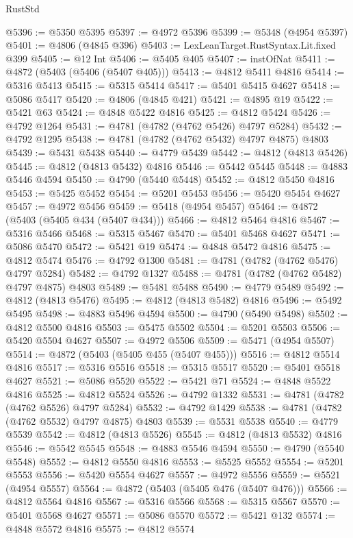 \begin{lexlean}{RustStd}
\begin{coremodule}
@5396 := @5350 @5395
@5397 := @4972 @5396
@5399 := @5348 (@4954 @5397)
@5401 := @4806 (@4845 @396)
@5403 := LexLeanTarget.RustSyntax.Lit.fixed @399
@5405 := @12 Int
@5406 := @5405 @405
@5407 := instOfNat
@5411 := @4872 (@5403 (@5406 (@5407 @405)))
@5413 := @4812 @5411 @4816
@5414 := @5316 @5413
@5415 := @5315 @5414
@5417 := @5401 @5415 @4627
@5418 := @5086 @5417
@5420 := @4806 (@4845 @421)
@5421 := @4895 @19
@5422 := @5421 @63
@5424 := @4848 @5422 @4816
@5425 := @4812 @5424
@5426 := @4792 @1264
@5431 := @4781 (@4782 (@4762 @5426) @4797 @5284)
@5432 := @4792 @1295
@5438 := @4781 (@4782 (@4762 @5432) @4797 @4875) @4803
@5439 := @5431 @5438
@5440 := @4779 @5439
@5442 := @4812 (@4813 @5426)
@5445 := @4812 (@4813 @5432) @4816
@5446 := @5442 @5445
@5448 := @4883 @5446 @4594
@5450 := @4790 (@5440 @5448)
@5452 := @4812 @5450 @4816
@5453 := @5425 @5452
@5454 := @5201 @5453
@5456 := @5420 @5454 @4627
@5457 := @4972 @5456
@5459 := @5418 (@4954 @5457)
@5464 := @4872 (@5403 (@5405 @434 (@5407 @434)))
@5466 := @4812 @5464 @4816
@5467 := @5316 @5466
@5468 := @5315 @5467
@5470 := @5401 @5468 @4627
@5471 := @5086 @5470
@5472 := @5421 @19
@5474 := @4848 @5472 @4816
@5475 := @4812 @5474
@5476 := @4792 @1300
@5481 := @4781 (@4782 (@4762 @5476) @4797 @5284)
@5482 := @4792 @1327
@5488 := @4781 (@4782 (@4762 @5482) @4797 @4875) @4803
@5489 := @5481 @5488
@5490 := @4779 @5489
@5492 := @4812 (@4813 @5476)
@5495 := @4812 (@4813 @5482) @4816
@5496 := @5492 @5495
@5498 := @4883 @5496 @4594
@5500 := @4790 (@5490 @5498)
@5502 := @4812 @5500 @4816
@5503 := @5475 @5502
@5504 := @5201 @5503
@5506 := @5420 @5504 @4627
@5507 := @4972 @5506
@5509 := @5471 (@4954 @5507)
@5514 := @4872 (@5403 (@5405 @455 (@5407 @455)))
@5516 := @4812 @5514 @4816
@5517 := @5316 @5516
@5518 := @5315 @5517
@5520 := @5401 @5518 @4627
@5521 := @5086 @5520
@5522 := @5421 @71
@5524 := @4848 @5522 @4816
@5525 := @4812 @5524
@5526 := @4792 @1332
@5531 := @4781 (@4782 (@4762 @5526) @4797 @5284)
@5532 := @4792 @1429
@5538 := @4781 (@4782 (@4762 @5532) @4797 @4875) @4803
@5539 := @5531 @5538
@5540 := @4779 @5539
@5542 := @4812 (@4813 @5526)
@5545 := @4812 (@4813 @5532) @4816
@5546 := @5542 @5545
@5548 := @4883 @5546 @4594
@5550 := @4790 (@5540 @5548)
@5552 := @4812 @5550 @4816
@5553 := @5525 @5552
@5554 := @5201 @5553
@5556 := @5420 @5554 @4627
@5557 := @4972 @5556
@5559 := @5521 (@4954 @5557)
@5564 := @4872 (@5403 (@5405 @476 (@5407 @476)))
@5566 := @4812 @5564 @4816
@5567 := @5316 @5566
@5568 := @5315 @5567
@5570 := @5401 @5568 @4627
@5571 := @5086 @5570
@5572 := @5421 @132
@5574 := @4848 @5572 @4816
@5575 := @4812 @5574

\end{coremodule}
\end{lexlean}
